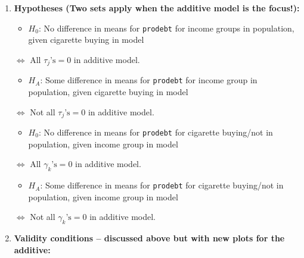 \documentclass[]{book}
\providecommand{\tightlist}{%
  \setlength{\itemsep}{0pt}\setlength{\parskip}{0pt}}
\theoremstyle{definition}
\theoremstyle{definition}
\theoremstyle{remark}
\begin{document}
\begin{enumerate}
\def\labelenumi{\arabic{enumi}.}
\item
  \textbf{Hypotheses (Two sets apply when the additive model is the
  focus!):}

  \begin{itemize}
  \tightlist
  \item
    \(H_0\): No difference in means for \texttt{prodebt} for income
    groups in population, given cigarette buying in model
  \end{itemize}

  \(\Leftrightarrow\) All \(\tau_j\text{'s} = 0\) in additive model.

  \begin{itemize}
  \tightlist
  \item
    \(H_A\): Some difference in means for \texttt{prodebt} for income
    group in population, given cigarette buying in model
  \end{itemize}

  \(\Leftrightarrow\) Not all \(\tau_j\text{'s} = 0\) in additive model.

  \begin{itemize}
  \tightlist
  \item
    \(H_0\): No difference in means for \texttt{prodebt} for cigarette
    buying/not in population, given income group in model 
  \end{itemize}

  \(\Leftrightarrow\) All \(\gamma_k\text{'s} = 0\) in additive model.

  \begin{itemize}
  \tightlist
  \item
    \(H_A\): Some difference in means for \texttt{prodebt} for cigarette
    buying/not in population, given income group in model
  \end{itemize}

  \(\Leftrightarrow\) Not all \(\gamma_k\text{'s} = 0\) in additive
  model.
\item
  \textbf{Validity conditions -- discussed above but with new plots for
  the additive:}


\end{enumerate}
\end{document}
